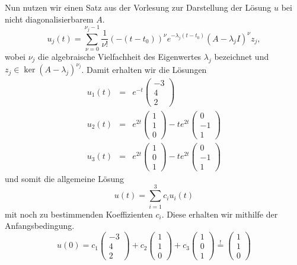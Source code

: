 \documentclass[10pt,a4paper]{article}
\begin{document}
Nun nutzen wir einen Satz aus der Vorlesung zur Darstellung der Lösung $u$ bei nicht diagonalisierbarem $A$.
\begin{equation*}
	u_j(t) = \sum_{\nu = 0}^{\nu_j -1} \frac{1}{\nu !} \left(-(t-t_0)\right)^{\nu} e^{-\lambda_j (t-t_0)} \left(A-\lambda_j I\right)^{\nu} z_j,
\end{equation*}
wobei $\nu_j$ die algebraische Vielfachheit des Eigenwertes $\lambda_j$ bezeichnet und $z_j \in \ker(A-\lambda_j)^{\nu_j}$. Damit erhalten wir die Lösungen
\begin{eqnarray*}
	u_1(t) &=& e^{-t} \begin{pmatrix}-3\\4\\2\end{pmatrix}\\
	u_2(t) &=& e^{2t} \begin{pmatrix}1\\1\\0\end{pmatrix} - t e^{2t} \begin{pmatrix}0\\-1\\1\end{pmatrix}\\
	u_3(t) &=& e^{2t} \begin{pmatrix}1\\0\\1\end{pmatrix} - t e^{2t} \begin{pmatrix}0\\-1\\1\end{pmatrix}
\end{eqnarray*}
und somit die allgemeine Lösung
\begin{equation*}
 u(t) = \sum_{i=1}^3 c_i u_i(t)
\end{equation*}
mit noch zu bestimmenden Koeffizienten $c_i$. Diese erhalten wir mithilfe der Anfangsbedingung.
\begin{equation*}
 u(0) = c_1 \begin{pmatrix}-3\\4\\2\end{pmatrix} + c_2 \begin{pmatrix}1\\1\\0\end{pmatrix} + c_3 \begin{pmatrix}1\\0\\1\end{pmatrix} \stackrel{!}{=} \begin{pmatrix}1\\1\\0\end{pmatrix}
\end{equation*}
\end{document}
